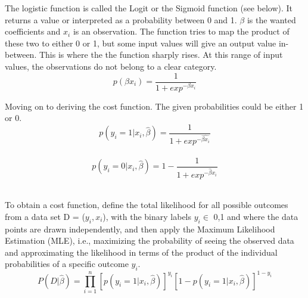 The logistic function is called the Logit or the Sigmoid function (see below). It returns a value or interpreted as a probability between 0 and 1. $\beta$ is the wanted coefficients and $x_i$ is an observation. The function tries to map the product of these two to either 0 or 1, but some input values will give an output value in-between. This is where the the function sharply rises. At this range of input values, the observations do not belong to a clear category.    
\begin{equation}
p(\beta x_i)=\frac{1}{1+exp^{-\beta x_i}}
\end{equation}
\par

Moving on to deriving the cost function. The given probabilities could be either 1 or 0.
\begin{equation}
p(y_i = 1\vert x_i,\hat{\beta}) = \frac{1}{1+exp^{-\hat{\beta x_i}}}
\end{equation}
\\
\begin{equation}
p(y_i=0\vert x_i,\hat{\beta})=1-\frac{1}{1+exp^{-\hat{\beta}x_i}}
\end{equation}
\\
\par

To obtain a cost function, define the total likelihood for all possible outcomes from a data set D = {($y_i,x_i$)}, with the binary labels $y_i \in$ {0,1} and where the data points are drawn independently, and then apply the Maximum Likelihood Estimation (MLE), i.e., maximizing the probability of seeing the observed data and approximating the likelihood in terms of the product of the individual probabilities of a specific outcome $y_i$. 
\begin{equation}
P(D\vert \hat{\beta})=\prod_{i=1}^{n} [p(y_i=1\vert x_i,\hat{\beta})]^{y_i} 
[1-p(y_i=1\vert x_i,\hat{\beta})]^{1-y_i} 
\end{equation}
\\
\par


